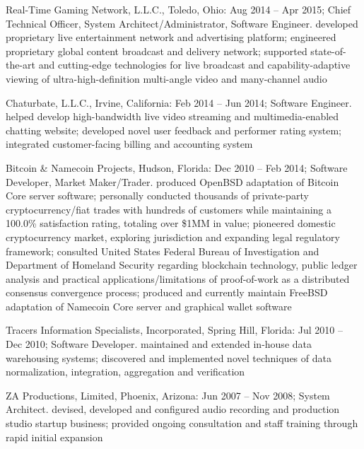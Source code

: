 {{		\hfil%
		\par%
		\medskip%
		\myrm%
		{%
			\myit%
			Real-Time Gaming Network, L.L.C., %
		}%
		Toledo, Ohio: Aug 2014 -- Apr 2015; Chief Technical Officer, System Architect/Administrator, Software Engineer. developed proprietary live entertainment network and advertising platform; engineered proprietary global content broadcast and delivery network; supported state-of-the-art and cutting-edge technologies for live broadcast and capability-adaptive viewing of ultra-high-definition multi-angle video and many-channel audio%
		\hfil%
		\par%
		\medskip%
		\myrm%
		{%
			\myit%
			Chaturbate, L.L.C., %
		}%
		Irvine, California: Feb 2014 -- Jun 2014; Software Engineer. helped develop high-bandwidth live video streaming and multimedia-enabled chatting website; developed novel user feedback and performer rating system; integrated customer-facing billing and accounting system%
		\hfil%
		\par%
		\medskip%
		\myrm%
		{%
			\myit%
			Bitcoin \& Namecoin Projects, %
		}%
		Hudson, Florida: Dec 2010 -- Feb 2014; Software Developer, Market Maker/Trader. produced OpenBSD adaptation of Bitcoin Core server software; personally conducted thousands of private-party cryptocurrency/fiat trades with hundreds of customers while maintaining a 100.0\% satisfaction rating, totaling over \$1MM in value; pioneered domestic cryptocurrency market, exploring jurisdiction and expanding legal regulatory framework; consulted United States Federal Bureau of Investigation and Department of Homeland Security regarding blockchain technology, public ledger analysis and practical applications/limitations of proof-of-work as a distributed consensus convergence process; produced and currently maintain FreeBSD adaptation of Namecoin Core server and graphical wallet software%
		\hfil%
		\par%
		\medskip%
		\myrm%
		{%
			\myit%
			Tracers Information Specialists, Incorporated, %
		}%
		Spring Hill, Florida: Jul 2010 -- Dec 2010; Software Developer. maintained and extended in-house data warehousing systems; discovered and implemented novel techniques of data normalization, integration, aggregation and verification%
		\hfil%
		\par%
		\medskip%
		\myrm%
		{%
			\myit%
			ZA Productions, Limited, %
		}%
		Phoenix, Arizona: Jun 2007 -- Nov 2008; System Architect. devised, developed and configured audio recording and production studio startup business; provided ongoing consultation and staff training through rapid initial expansion%
}}
